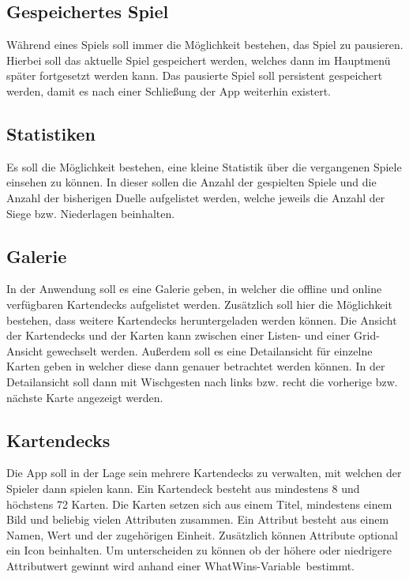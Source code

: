 \subsection{Gespeichertes Spiel}

Während eines Spiels soll immer die Möglichkeit bestehen, das Spiel zu pausieren. Hierbei soll das aktuelle Spiel gespeichert werden, welches dann im Hauptmenü später fortgesetzt werden kann. Das pausierte Spiel soll persistent gespeichert werden, damit es nach einer Schließung der App weiterhin existert.

\subsection{Statistiken}

Es soll die Möglichkeit bestehen, eine kleine Statistik über die vergangenen Spiele einsehen zu können. In dieser sollen die Anzahl der gespielten Spiele und die Anzahl der bisherigen Duelle aufgelistet werden, welche jeweils die Anzahl der Siege bzw. Niederlagen beinhalten.

\subsection{Galerie}

In der Anwendung soll es eine Galerie geben, in welcher die offline und online verfügbaren Kartendecks aufgelistet werden. Zusätzlich soll hier die Möglichkeit bestehen, dass weitere Kartendecks heruntergeladen werden können. Die Ansicht der Kartendecks und der Karten kann zwischen einer Listen- und einer Grid-Ansicht gewechselt werden. Außerdem soll es eine Detailansicht für einzelne Karten geben in welcher diese dann genauer betrachtet werden können. In der Detailansicht soll dann mit Wischgesten nach links bzw. recht die vorherige bzw. nächste Karte angezeigt werden.

\subsection{Kartendecks}

Die App soll in der Lage sein mehrere Kartendecks zu verwalten, mit welchen der Spieler dann spielen kann. Ein Kartendeck besteht aus mindestens 8 und höchstens 72 Karten. Die Karten setzen sich aus einem Titel, mindestens einem Bild und beliebig vielen Attributen zusammen. Ein Attribut besteht aus einem Namen, Wert und der zugehörigen Einheit. Zusätzlich können Attribute optional ein Icon beinhalten. Um unterscheiden zu können ob der höhere oder niedrigere Attributwert gewinnt wird anhand einer \glqq WhatWins-Variable\grqq\ bestimmt.

